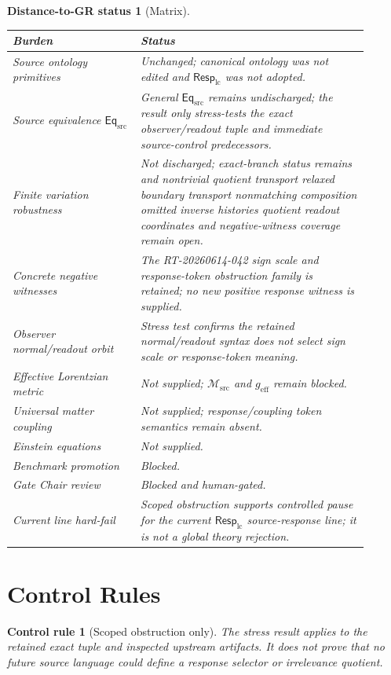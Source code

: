 \documentclass[11pt]{article}
\newcommand{\EqSrc}{\mathsf{Eq}_{\mathrm{src}}}
\newcommand{\Msrc}{\mathcal{M}_{\mathrm{src}}}
\newcommand{\RespLC}{\mathsf{Resp}_{\mathrm{lc}}}
\newcommand{\geff}{g_{\mathrm{eff}}}
\newtheorem{controlrule}{Control rule}
\newtheorem{distancestatus}{Distance-to-GR status}
\begin{document}
\begin{distancestatus}[Matrix]
\begin{center}
\small
\begin{tabular}{p{0.32\linewidth}p{0.58\linewidth}}
\hline
\textbf{Burden} & \textbf{Status} \\
\hline
Source ontology primitives & Unchanged; canonical ontology was not edited and \(\RespLC\) was not adopted. \\
Source equivalence \(\EqSrc\) & General \(\EqSrc\) remains undischarged; the result only stress-tests the exact observer/readout tuple and immediate source-control predecessors. \\
Finite variation robustness & Not discharged; exact-branch status remains and nontrivial quotient transport relaxed boundary transport nonmatching composition omitted inverse histories quotient readout coordinates and negative-witness coverage remain open. \\
Concrete negative witnesses & The RT-20260614-042 sign scale and response-token obstruction family is retained; no new positive response witness is supplied. \\
Observer normal/readout orbit & Stress test confirms the retained normal/readout syntax does not select sign scale or response-token meaning. \\
Effective Lorentzian metric & Not supplied; \(\Msrc\) and \(\geff\) remain blocked. \\
Universal matter coupling & Not supplied; response/coupling token semantics remain absent. \\
Einstein equations & Not supplied. \\
Benchmark promotion & Blocked. \\
Gate Chair review & Blocked and human-gated. \\
Current line hard-fail & Scoped obstruction supports controlled pause for the current \(\RespLC\) source-response line; it is not a global theory rejection. \\
\hline
\end{tabular}
\end{center}
\end{distancestatus}

\section{Control Rules}

\begin{controlrule}[Scoped obstruction only]
The stress result applies to the retained exact tuple and inspected
upstream artifacts. It does not prove that no future source language
could define a response selector or irrelevance quotient.
\end{controlrule}
\end{document}
